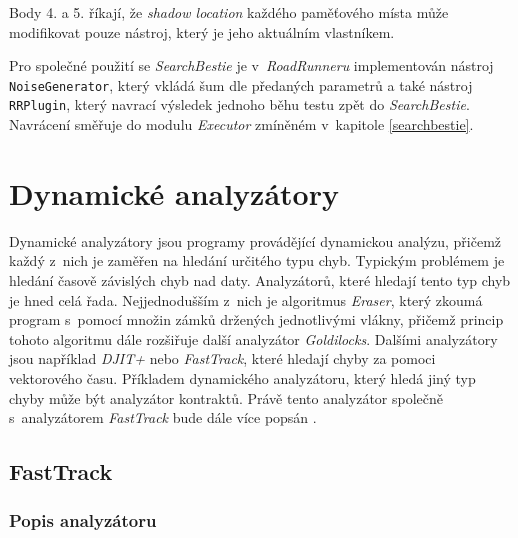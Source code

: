 Body 4. a 5. říkají, že \textit{shadow location} každého paměťového místa může modifikovat pouze nástroj, který je jeho aktuálním vlastníkem.

Pro společné použití se \textit{SearchBestie} je v~\textit{RoadRunneru} implementován nástroj \texttt{NoiseGenerator}, který vkládá šum dle předaných parametrů a také nástroj \texttt{RRPlugin}, který navrací výsledek jednoho běhu testu zpět do \textit{SearchBestie}. Navrácení směřuje do modulu \textit{Executor} zmíněném v~kapitole \ref{searchbestie}.


\chapter{Dynamické analyzátory}\label{dynamic-analysators}

Dynamické analyzátory jsou programy provádějící dynamickou analýzu, přičemž každý z~nich je zaměřen na hledání určitého typu chyb. Typickým problémem je hledání časově závislých chyb nad daty. Analyzátorů, které hledají tento typ chyb je hned celá řada. Nejjednodušším z~nich je algoritmus \textit{Eraser}, který zkoumá program s~pomocí množin zámků držených jednotlivými vlákny, přičemž princip tohoto algoritmu dále rozšiřuje další analyzátor \textit{Goldilocks}. Dalšími analyzátory jsou například \textit{DJIT+} nebo \textit{FastTrack}, které hledají chyby za pomoci vektorového času. Příkladem dynamického analyzátoru, který hledá jiný typ chyby může být analyzátor kontraktů. Právě tento analyzátor společně s~analyzátorem \textit{FastTrack} bude dále více popsán \cite{cite:ft,cite:eraser,cite:contract1}.

\section{FastTrack}\label{fasttrack}

\subsection{Popis analyzátoru}

